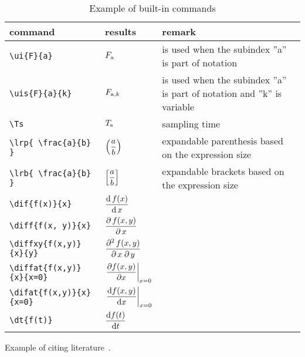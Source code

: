 \begin{table}[h]
	\centering
	\caption{Example of built-in commands}
	\label{tab:commands}
	\begin{tabular}{llp{5cm}}
		\toprule
			command & results & remark\\
		\midrule
		  \texttt{\textbackslash{ui\{F\}\{a\}}} &  $F _{\text{a}}$ & is used 
		  when the subindex ''a'' is part 
		  of notation\\
		  \texttt{\textbackslash{uis\{F\}\{a\}\{k\}}} &  $F _{\text{a}, k}$ & is 
		  used  when  the  subindex ''a'' is  part  of notation and ''k'' is 
		  variable 
		  \\
		  \texttt{\textbackslash{Ts}} & $T _{\text{s}}$ & sampling time \\[2pt]
		  \texttt{\textbackslash{lrp\{ \textbackslash{frac\{a\}\{b\}} \}}} & 
		  $\displaystyle\left( \frac{a}{b} \right)$& 
		  expandable parenthesis based on 
		  the expression size\\
		  \texttt{\textbackslash{lrb\{ \textbackslash{frac\{a\}\{b\}} \}}} & 
		  $\displaystyle\left[ \frac{a}{b} \right]$& 
		  expandable brackets based on 
		  the expression size\\
		  \texttt{\textbackslash{dif\{f(x)\}\{x\}}} & 
		  $\displaystyle\frac{\mathrm{d}\, f(x)}{\mathrm{d}\, x}$& \\[10pt]
		  \texttt{\textbackslash{diff\{f(x, y)\}\{x\}}} & 
		  $\displaystyle\frac{\partial\, f(x,y )}{\partial\, x}$& \\[10pt]
		  \texttt{\textbackslash{diffxy\{f(x,y)\}\{x\}\{y\}}} & 
		  $\displaystyle\frac{\partial^2\, f(x, y)}{\partial\, x\; \partial\, y}$& \\[10pt]
		  \texttt{\textbackslash{diffat\{f(x,y)\}\{x\}\{x=0\}}} & 
		  $\displaystyle\left.\frac{\partial f(x, y)}{\partial x}\right\vert_{x=0}$& \\[10pt]
		  \texttt{\textbackslash{difat\{f(x,y)\}\{x\}\{x=0\}}} & 
		  $\displaystyle\left.\frac{\mathrm{d} f(x, y)}{\mathrm{d} x}\right\vert_{x=0}$& \\[10pt]
		  \texttt{\textbackslash{dt\{f(t)\} } } & $\displaystyle\frac{\mathrm{d}f(t)}{\mathrm{d}t}$  & \\
		\bottomrule
	\end{tabular}
\end{table}

Example of citing literature~\cite{boyd:book:2009:cvx}.